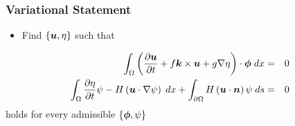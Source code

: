 \begin{frame}%
  \frametitle{Variational Statement}
  \begin{itemize}
    \item{Find $\{{\boldsymbol{u}}, \eta\}$ such that}
  \end{itemize}
  \begin{eqnarray}
    \nonumber
    \int_{\Omega}
    \left(
    \frac{\partial {\boldsymbol{u}}}{\partial t} + f {\boldsymbol{k}}\times {\boldsymbol{u}} + g \nabla \eta
    \right) \cdot {\boldsymbol{\phi}} \;dx &=& 0 \\
    \nonumber
    \int_{\Omega}
    \frac{\partial \eta}{\partial t}\psi - H \left( {\boldsymbol{u}} \cdot \nabla \psi \right)\;dx
    + \int_{\partial \Omega} H \left( {\boldsymbol{u}} \cdot {\boldsymbol{n}} \right) \psi \;ds &=& 0
  \end{eqnarray}
  holds for every admissible $\{{\boldsymbol{\phi}}, \psi\}$
\end{frame}
